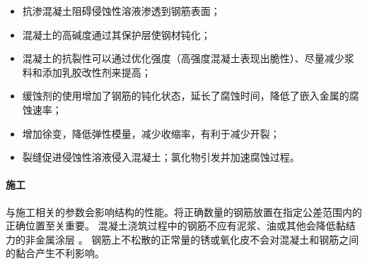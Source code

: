 \begin{itemize}
  \item 抗渗混凝土阻碍侵蚀性溶液渗透到钢筋表面；
  \item 混凝土的高碱度通过其保护层使钢材钝化；
  \item 混凝土的抗裂性可以通过优化强度（高强度混凝土表现出脆性）、尽量减少浆料和添加乳胶改性剂来提高；
  \item 缓蚀剂的使用增加了钢筋的钝化状态，延长了腐蚀时间，降低了嵌入金属的腐蚀速率；
  \item 增加徐变，降低弹性模量，减少收缩率，有利于减少开裂；
  \item 裂缝促进侵蚀性溶液侵入混凝土；氯化物引发并加速腐蚀过程。
\end{itemize}

\paragraph{施工}
与施工相关的参数会影响结构的性能。将正确数量的钢筋放置在指定公差范围内的正确位置至关重要。 混凝土浇筑过程中的钢筋不应有泥浆、油或其他会降低黏结力的非金属涂层 \cite{aci2011b}。 钢筋上不松散的正常量的锈或氧化皮不会对混凝土和钢筋之间的黏合产生不利影响。

